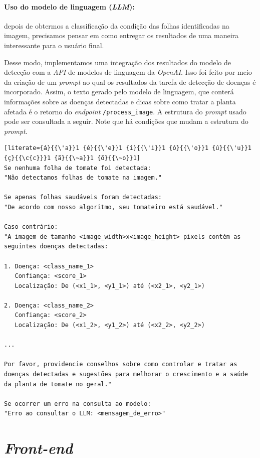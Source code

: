 \paragraph{Uso do modelo de linguagem (\emph{LLM}):} depois de obtermos a classificação da condição das folhas identificadas na imagem, precisamos pensar em como entregar os resultados de uma maneira interessante para o usuário final.

Desse modo, implementamos uma integração dos resultados do modelo de detecção com a \emph{API} de modelos de linguagem da \emph{OpenAI}. Isso foi feito por meio da criação de um \emph{prompt} ao qual os resultados da tarefa de detecção de doenças é incorporado. Assim, o texto gerado pelo modelo de linguagem, que conterá informações sobre as doenças detectadas e dicas sobre como tratar a planta afetada é o retorno do \emph{endpoint} \texttt{/process\_image}. A estrutura do \emph{prompt} usado pode ser consultada a seguir. Note que há condições que mudam a estrutura do \emph{prompt}.

\begin{lstlisting}[literate={á}{{\'a}}1 {é}{{\'e}}1 {í}{{\'i}}1 {ó}{{\'o}}1 {ú}{{\'u}}1 {ç}{{\c{c}}}1 {ã}{{\~a}}1 {õ}{{\~o}}1]
Se nenhuma folha de tomate foi detectada:
"Não detectamos folhas de tomate na imagem."

Se apenas folhas saudáveis foram detectadas:
"De acordo com nosso algoritmo, seu tomateiro está saudável."

Caso contrário:
"A imagem de tamanho <image_width>x<image_height> pixels contém as seguintes doenças detectadas:

1. Doença: <class_name_1>
   Confiança: <score_1>
   Localização: De (<x1_1>, <y1_1>) até (<x2_1>, <y2_1>)

2. Doença: <class_name_2>
   Confiança: <score_2>
   Localização: De (<x1_2>, <y1_2>) até (<x2_2>, <y2_2>)

...

Por favor, providencie conselhos sobre como controlar e tratar as doenças detectadas e sugestões para melhorar o crescimento e a saúde da planta de tomate no geral."

Se ocorrer um erro na consulta ao modelo:
"Erro ao consultar o LLM: <mensagem_de_erro>"

\end{lstlisting}

\section{\emph{Front-end}}

